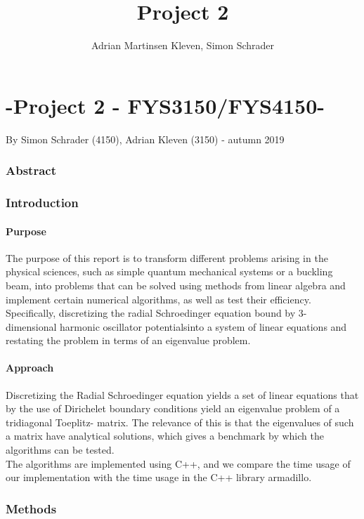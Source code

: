\documentclass[10pt,a4paper]{article}
\author{Adrian Martinsen Kleven, Simon Schrader}
\title{Project 2}
\begin{document}
\part*{-Project 2 - FYS3150/FYS4150-
}
{\large By Simon Schrader (4150), Adrian Kleven (3150) - autumn 2019
}
\tableofcontents

\listoffigures
\listoftables

 
\clearpage
 
\section{Abstract}

\section{Introduction}
\subsection{Purpose} 
The purpose of this report is to transform different problems arising in the physical sciences, such as simple quantum mechanical systems or a buckling beam, into problems that can be solved using methods from linear algebra and implement certain numerical algorithms, as well as test their efficiency.
Specifically, discretizing the radial Schroedinger equation bound by 3- dimensional harmonic oscillator potentialsinto a system of linear equations and restating the problem in terms of an eigenvalue problem.
\subsection{Approach}
Discretizing the Radial Schroedinger equation yields a set of linear equations that by the use of Dirichelet boundary conditions yield an eigenvalue problem of a tridiagonal Toeplitz- matrix. The relevance of this is that the eigenvalues of such a matrix have analytical solutions, which gives a benchmark by which the algorithms can be tested.\\The algorithms are implemented using C++, and we compare the time usage of our implementation with the time usage in the C++ library armadillo.
\section{Methods}
\end{document}
